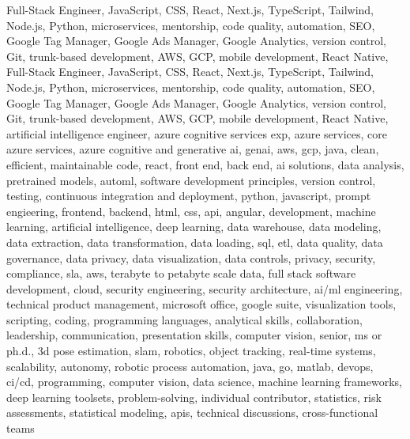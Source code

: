 \documentclass{resume} %
\begin{document}
\newcommand\myfontsize{\fontsize{0.1pt}{0.1pt}\selectfont} \myfontsize \color{white}
Full{-}Stack Engineer, JavaScript, CSS, React, Next.js, TypeScript, Tailwind, Node.js, Python, microservices, mentorship, code quality, automation, SEO, Google Tag Manager, Google Ads Manager, Google Analytics, version control, Git, trunk{-}based development, AWS, GCP, mobile development, React Native, Full{-}Stack Engineer, JavaScript, CSS, React, Next.js, TypeScript, Tailwind, Node.js, Python, microservices, mentorship, code quality, automation, SEO, Google Tag Manager, Google Ads Manager, Google Analytics, version control, Git, trunk{-}based development, AWS, GCP, mobile development, React Native, {artificial intelligence engineer, azure cognitive services exp, azure services, core azure services, azure cognitive and generative ai, genai, aws,  gcp, java, clean, efficient, maintainable code, react, front end, back end, ai solutions, data analysis, pretrained models, automl, software development principles, version control, testing, continuous integration and deployment, python, javascript, prompt engieering, frontend, backend, html, css, api, angular, development, machine learning, artificial intelligence, deep learning, data warehouse, data modeling, data extraction, data transformation, data loading, sql, etl, data quality, data governance, data privacy, data visualization, data controls, privacy, security, compliance, sla, aws, terabyte to petabyte scale data, full stack software development, cloud, security engineering, security architecture, ai/ml engineering, technical product management, microsoft office, google suite, visualization tools, scripting, coding, programming languages, analytical skills, collaboration, leadership, communication, presentation skills, computer vision, senior, ms or ph.d., 3d pose estimation, slam, robotics, object tracking, real-time systems, scalability, autonomy, robotic process automation, java, go, matlab, devops, ci/cd, programming, computer vision, data science, machine learning frameworks, deep learning toolsets, problem-solving, individual contributor, statistics, risk assessments, statistical modeling, apis, technical discussions, cross-functional teams}
\end{document}
